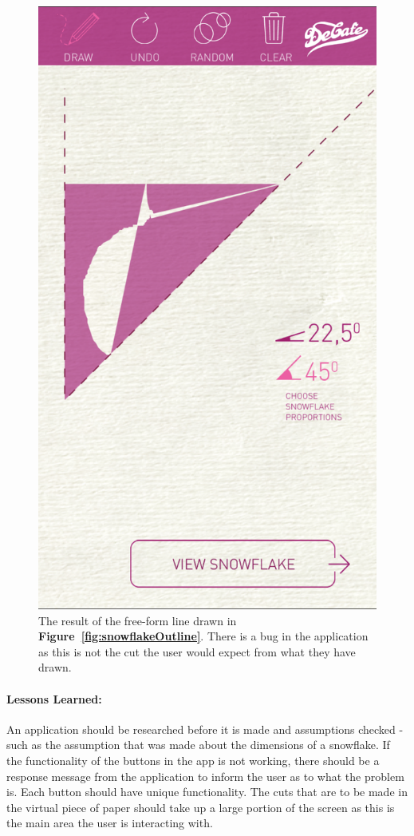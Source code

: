 \documentclass[11pt]{article}
\begin{document}
\begin{figure}[!ht]
\begin{minipage}{0.45\textwidth}
                            \includegraphics[width=0.7\linewidth]{Images/snowflakeCut}
                            \caption{The result of the free-form line drawn in \textbf{Figure~\ref{fig:snowflakeOutline}}. There is a bug in the application as this is not the cut the user would expect from what they have drawn.}
                            \label{fig:snowflakeCut}
                        \end{minipage}
                    \end{figure}
        
                \paragraph{Lessons Learned:}
                An application should be researched before it is made and assumptions checked - such as the assumption that was made about the dimensions of a snowflake. If the functionality of the buttons in the app is not working, there should be a response message from the application to inform the user as to what the problem is. Each button should have unique functionality. The cuts that are to be made in the virtual piece of paper should take up a large portion of the screen as this is the main area the user is interacting with.
            
\end{document}
